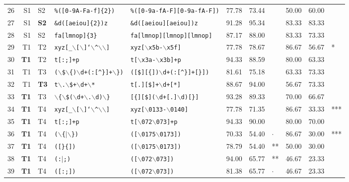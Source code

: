 \begin{table*}[ht]
\begin{tabular}{p{0.3cm}r@{ -- }lp{4cm}p{4cm}|p{0.99cm}p{0.99cm}p{0.6cm}|p{0.99cm}p{0.99cm}p{0.6cm}}
  26 & S1 & S2 & {\tt \%([0-9A-Fa-f]\{2\})} & {\tt \%([0-9a-fA-F][0-9a-fA-F])} & 77.78 & 73.44 &   & 50.00 & 60.00 &   \\ 
  27 & S1 & {\bf S2} & {\tt \&d([aeiou]\{2\})z} & {\tt \&d([aeiou][aeiou])z} & 91.28 & 95.34 &   & 83.33 & 83.33 &   \\ 
  28 & S1 & S2 & {\tt fa[lmnop]\{3\}} & {\tt fa[lmnop][lmnop][lmnop]} & 87.17 & 88.00 &   & 83.33 & 73.33 &   \\ 
  \hline
  
  29 & T1 & T2 & {\tt xyz[\_$\backslash$[$\backslash$]`$\backslash$\verb|^|$\backslash$$\backslash$]} & {\tt xyz[$\backslash$x5b-$\backslash$x5f]} & 77.78 & 78.67 &   & 86.67 & 56.67 & * \\ 
  30 & {\bf T1} & T2 & {\tt t[:;]+p} & {\tt t[$\backslash$x3a-$\backslash$x3b]+p} & 94.33 & 88.59 &   & 80.00 & 63.33 &   \\ 
  
  31 & T1 & T3 & {\tt ($\backslash$\$$\backslash$\{)$\backslash$d+(:[\verb|^|\}]+$\backslash$\})} & {\tt ([\$][\{])$\backslash$d+(:[\verb|^|\}]+[\}])} & 81.61 & 75.18 &   & 63.33 & 73.33 &   \\ 
  32 & T1 & {\bf T3} & {\tt t$\backslash$.$\backslash$\$+$\backslash$d+$\backslash$*} & {\tt t[.][\$]+$\backslash$d+[*]} & 88.67 & 94.00 &   & 56.67 & 73.33 &   \\ 
  33 & {\bf T1} & T3 & {\tt $\backslash$\{$\backslash$\$($\backslash$d+$\backslash$.$\backslash$d)$\backslash$\}} & {\tt [\{][\$]($\backslash$d+[.]$\backslash$d)[\}]} & 93.28 & 89.33 &   & 70.00 & 66.67 &   \\ 
  
  34 & {\bf T1} & T4 & {\tt xyz[\_$\backslash$[$\backslash$]`$\backslash$\verb|^|$\backslash$$\backslash$]} & {\tt xyz[$\backslash$0133-$\backslash$0140]} & 77.78 & 71.35 &   & 86.67 & 33.33 & *** \\ 

  35 & {\bf T1} & T4 & {\tt t[:;]+p} & {\tt t[$\backslash$072$\backslash$073]+p} & 94.33 & 90.00 &   & 80.00 & 70.00 &   \\ 
  
  36 & {\bf T1} & T4 & {\tt ($\backslash$\{$|$$\backslash$\})} & {\tt ([$\backslash$0175$\backslash$0173])} & 70.33 & 54.40 & $\cdot$ & 86.67 & 30.00 & *** \\ 
  37 & {\bf T1} & T4 & {\tt ([\}\{])} & {\tt ([$\backslash$0175$\backslash$0173])} & 78.79 & 54.40 & ** & 50.00 & 30.00 &   \\ 
  38 & {\bf T1} & T4 & {\tt (:$|$;)} & {\tt ([$\backslash$072$\backslash$073])} & 94.00 & 65.77 & ** & 46.67 & 23.33 &   \\ 
  39 & {\bf T1} & T4 & {\tt ([:;])} & {\tt ([$\backslash$072$\backslash$073])} & 81.38 & 65.77 & $\cdot$ & 46.67 & 23.33 &   \\ 
  

\end{tabular}
\end{table*}
